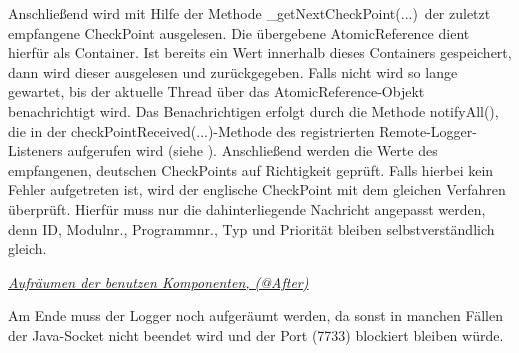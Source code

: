 
Anschließend wird mit Hilfe der Methode \glqq \_getNextCheckPoint(...)\grqq\ der zuletzt empfangene CheckPoint ausgelesen. Die übergebene AtomicReference dient hierfür als Container. Ist bereits ein Wert innerhalb dieses Containers gespeichert, dann wird dieser ausgelesen und zurückgegeben. Falls nicht wird so lange gewartet, bis der aktuelle Thread über das AtomicReference-Objekt benachrichtigt wird. Das Benachrichtigen erfolgt durch die Methode \glqq notifyAll()\grqq, die in der \glqq checkPointReceived(...)\grqq-Methode des registrierten Remote-Logger-Listeners aufgerufen wird (siehe ).
Anschließend werden die Werte des empfangenen, deutschen CheckPoints auf Richtigkeit geprüft. Falls hierbei kein Fehler aufgetreten ist, wird der englische CheckPoint mit dem gleichen Verfahren überprüft. Hierfür muss nur die dahinterliegende Nachricht angepasst werden, denn ID, Modulnr., Programmnr., Typ und Priorität bleiben selbstverständlich gleich.


\vspace{5px}
\par \textit{\underline{Aufräumen der benutzen Komponenten, (@After)}}
\par Am Ende muss der Logger noch aufgeräumt werden, da sonst in manchen Fällen der Java-Socket nicht beendet wird und der Port (7733) blockiert bleiben würde.